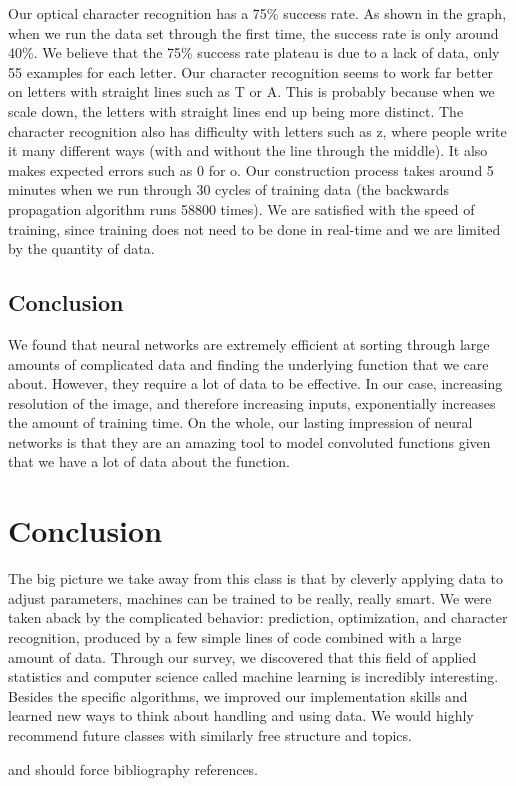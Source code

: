 \documentclass[11pt,a4paper]{article}
\begin{document}
Our optical character recognition has a 75\% success rate. As shown in the graph, when we run the data set through the first time, the success rate is only around 40\%. We believe that the 75\% success rate plateau is due to a lack of data, only 55 examples for each letter. Our character recognition seems to work far better on letters with straight lines such as T or A. This is probably because when we scale down, the letters with straight lines end up being more distinct. The character recognition also has difficulty with letters such as z, where people write it many different ways (with and without the line through the middle). It also makes expected errors such as 0 for o. Our construction process takes around 5 minutes when we run through 30 cycles of training data (the backwards propagation algorithm runs 58800 times). We are satisfied with the speed of training, since training does not need to be done in real-time and we are limited by the quantity of data.


\subsection{Conclusion}
\label{Artificial Neural Nets:Conclusion}

We found that neural networks are extremely efficient at sorting through large amounts of complicated data and finding the underlying function that we care about. However, they require a lot of data to be effective. In our case, increasing resolution of the image, and therefore increasing inputs, exponentially increases the amount of training time. On the whole, our lasting impression of neural networks is that they are an amazing tool to model convoluted functions given that we have a lot of data about the function.

\section{Conclusion}
\label{Conclusion}

The big picture we take away from this class is that by cleverly applying data to adjust parameters, machines can be trained to be really, really smart. We were taken aback by the complicated behavior: prediction, optimization, and character recognition, produced by a few simple lines of code combined with a large amount of data. Through our survey, we discovered that this field of applied statistics and computer science called machine learning is incredibly interesting. Besides the specific algorithms, we improved our implementation skills and learned new ways to think about handling and using data. We would highly recommend future classes with similarly free structure and topics.

 and  should force bibliography references.


\end{document}
